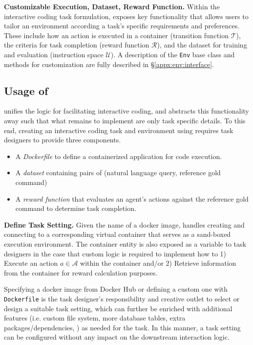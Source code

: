 \textbf{Customizable Execution, Dataset, Reward Function.} Within the interactive coding task formulation, \benchmark{} exposes key functionality that allows users to tailor an environment according a task's specific requirements and preferences. These include how an action is executed in a container (transition function $\mathcal{T}$), the criteria for task completion (reward function $\mathcal{R}$), and the dataset for training and evaluation (instruction space $\mathcal{U}$). A description of the \texttt{\benchmark{}Env} base class and methods for customization are fully described in \S\ref{appx:env:interface}.

\subsection{Usage of \benchmark{}}
\label{sec:benchmark:usage}
\benchmark{} unifies the logic for facilitating interactive coding, and abstracts this functionality away such that what remains to implement are only task specific details.
To this end, creating an interactive coding task and environment using \benchmark{} requires task designers to provide three components.
\begin{itemize}[noitemsep,topsep=0pt]
    \item A \textit{Dockerfile} to define a containerized application for code execution.
    \item A \textit{dataset} containing pairs of (natural language query, reference gold command)
    \item A \textit{reward function} that evaluates an agent's actions against the reference gold command to determine task completion.
\end{itemize}

\textbf{Define Task Setting.} Given the name of a docker image, \benchmark{} handles creating and connecting to a corresponding virtual container that serves as a sand-boxed execution environment.
The container entity is also exposed as a variable to task designers in the case that custom logic is required to implement how to 1) Execute an action $a \in \mathcal{A}$  within the container and/or 2) Retrieve information from the container for reward calculation purposes.

Specifying a docker image from Docker Hub or defining a custom one with \texttt{Dockerfile} is the task designer's responsibility and creative outlet to select or design a suitable task setting, which can further be enriched with additional features (i.e. custom file system, more database tables, extra packages/dependencies, ) as needed for the task.
In this manner, a task setting can be configured without any impact on the downstream interaction logic.


